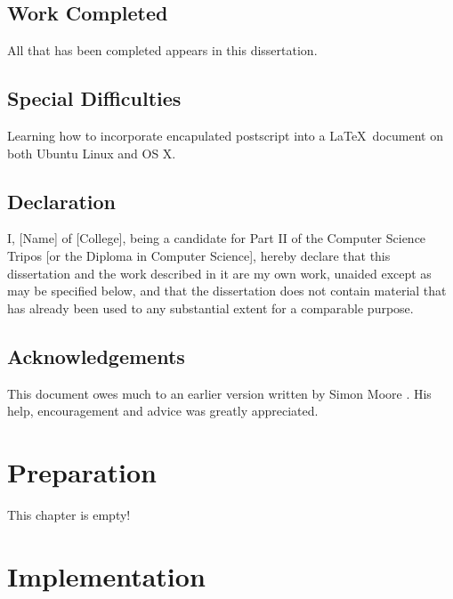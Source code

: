 \documentclass[12pt,a4paper,twoside,openright]{report}
\begin{document}
\section*{Work Completed}

All that has been completed appears in this dissertation.

\section*{Special Difficulties}

Learning how to incorporate encapulated postscript into a \LaTeX\
document on both Ubuntu Linux and OS X.
 
\newpage
\section*{Declaration}

I, [Name] of [College], being a candidate for Part II of the Computer
Science Tripos [or the Diploma in Computer Science], hereby declare
that this dissertation and the work described in it are my own work,
unaided except as may be specified below, and that the dissertation
does not contain material that has already been used to any substantial
extent for a comparable purpose.

\bigskip
{}

\medskip
{}

\tableofcontents

\listoffigures

\newpage
\section*{Acknowledgements}

This document owes much to an earlier version written by Simon Moore
\cite{poop}.  His help, encouragement and advice was greatly 
appreciated.


\pagestyle{headings}



\chapter{Preparation}

This chapter is empty!

\chapter{Implementation}
\end{document}
